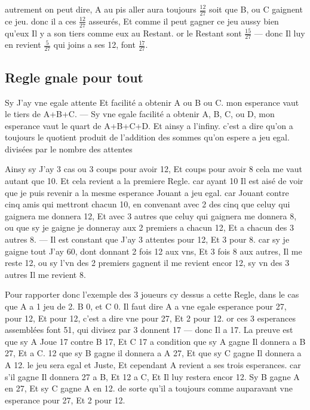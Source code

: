 \documentclass[11pt,a4paper]{article}
\begin{document}
autrement on peut dire, A au pis aller aura toujours $\frac{12}{27}$ soit que B, ou C gaignent ce jeu. donc il a ces $\frac{12}{27}$ asseurés, Et comme il peut gagner ce jeu aussy bien qu'eux Il y a son tiers comme eux au Restant. or le Restant sont $\frac{15}{27}$ — donc Il luy en revient $\frac{5}{27}$ qui joins a ses 12, font $\frac{17}{27}$.

\subsection*{Regle gnale pour tout}

Sy J'ay vne egale attente Et facilité a obtenir A ou B ou C. mon esperance  vaut le tiers de  A+B+C. — Sy vne egale facilité a obtenir A, B, C, ou D, mon esperance vaut le quart de A+B+C+D. Et ainsy a l'infiny. c'est a dire qu'on a toujours le quotient produit de l'addition des sommes qu'on espere a jeu egal.  divisées par le nombre des attentes

Ainsy sy J'ay \struck{\ill{}} 3 cas ou 3 coups pour avoir 12, Et  coups pour avoir 8 cela me vaut autant que 10. Et cela revient a la premiere Regle. car ayant 10 Il est aisé de voir que je puis revenir a la mesme esperance Jouant a jeu egal. car Jouant contre cinq amis qui mettront chacun 10,  en convenant avec 2 des cinq que celuy qui gaignera me donnera 12, Et avec 3 autres que celuy qui gaignera me donnera 8, ou que sy je gaigne je donneray aux 2 premiers a chacun 12, Et a chacun des 3 autres 8. — Il est constant que J'ay 3 attentes pour 12, Et 3 pour 8. car sy je gaigne tout J'ay 60, dont donnant  2 fois 12  aux vns, Et 3 fois 8 aux autres, Il me reste 12, ou sy l'vn des 2 premiers gagnent il me revient encor 12, sy vn des 3 autres Il me revient 8.

Pour rapporter donc l'exemple des 3 joueurs cy dessus a cette Regle, dans le cas que A a 1 jeu de 2. B 0, et C 0. Il faut dire A a vne egale esperance pour 27, pour 12, Et pour 12, c'est a dire vne pour 27, Et 2 pour 12. or ces 3 esperances assemblées font 51, qui divisez par 3 donnent 17 — donc Il a 17. La preuve est que sy A Joue 17 contre B 17, Et C 17 a condition que sy A gagne Il donnera a B 27, Et a C. 12 que sy B gagne il donnera a A 27, Et que sy C gagne Il donnera a A 12. le jeu sera egal et Juste, Et cependant A revient a ses trois esperances. car s'il gagne Il donnera 27 a B, Et 12 a C, Et Il luy restera encor 12. Sy B gagne A en  27, Et sy C gagne A en  12. de sorte qu'il a toujours comme auparavant vne esperance pour 27, Et 2 pour 12.
\end{document}
